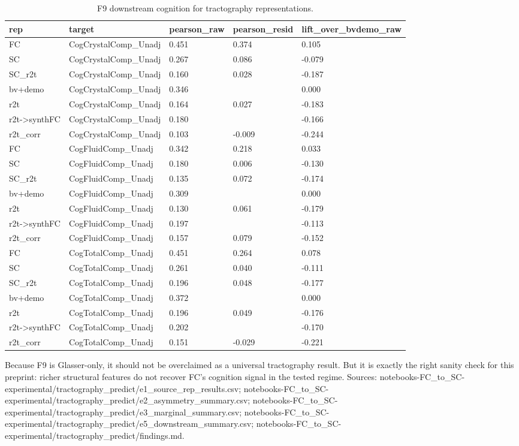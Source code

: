 \documentclass{article}
\begin{document}
\begin{table}[H]
\centering
\scriptsize
\caption{F9 downstream cognition for tractography representations.}
\label{tab:f9e5}
\begin{tabular}{lllll}
\toprule
rep & target & pearson\_raw & pearson\_resid & lift\_over\_bvdemo\_raw \\
\midrule
FC & CogCrystalComp\_Unadj & 0.451 & 0.374 & 0.105 \\
SC & CogCrystalComp\_Unadj & 0.267 & 0.086 & -0.079 \\
SC\_r2t & CogCrystalComp\_Unadj & 0.160 & 0.028 & -0.187 \\
bv+demo & CogCrystalComp\_Unadj & 0.346 &  & 0.000 \\
r2t & CogCrystalComp\_Unadj & 0.164 & 0.027 & -0.183 \\
r2t->synthFC & CogCrystalComp\_Unadj & 0.180 &  & -0.166 \\
r2t\_corr & CogCrystalComp\_Unadj & 0.103 & -0.009 & -0.244 \\
FC & CogFluidComp\_Unadj & 0.342 & 0.218 & 0.033 \\
SC & CogFluidComp\_Unadj & 0.180 & 0.006 & -0.130 \\
SC\_r2t & CogFluidComp\_Unadj & 0.135 & 0.072 & -0.174 \\
bv+demo & CogFluidComp\_Unadj & 0.309 &  & 0.000 \\
r2t & CogFluidComp\_Unadj & 0.130 & 0.061 & -0.179 \\
r2t->synthFC & CogFluidComp\_Unadj & 0.197 &  & -0.113 \\
r2t\_corr & CogFluidComp\_Unadj & 0.157 & 0.079 & -0.152 \\
FC & CogTotalComp\_Unadj & 0.451 & 0.264 & 0.078 \\
SC & CogTotalComp\_Unadj & 0.261 & 0.040 & -0.111 \\
SC\_r2t & CogTotalComp\_Unadj & 0.196 & 0.048 & -0.177 \\
bv+demo & CogTotalComp\_Unadj & 0.372 &  & 0.000 \\
r2t & CogTotalComp\_Unadj & 0.196 & 0.049 & -0.176 \\
r2t->synthFC & CogTotalComp\_Unadj & 0.202 &  & -0.170 \\
r2t\_corr & CogTotalComp\_Unadj & 0.151 & -0.029 & -0.221 \\
\bottomrule
\end{tabular}
\end{table}

Because F9 is Glasser-only, it should not be overclaimed as a universal tractography
result. But it is exactly the right sanity check for this preprint: richer structural
features do not recover FC's cognition signal in the tested regime.  Sources: notebooks-FC\_to\_SC-experimental/tractography\_predict/e1\_source\_rep\_results.csv; notebooks-FC\_to\_SC-experimental/tractography\_predict/e2\_asymmetry\_summary.csv; notebooks-FC\_to\_SC-experimental/tractography\_predict/e3\_marginal\_summary.csv; notebooks-FC\_to\_SC-experimental/tractography\_predict/e5\_downstream\_summary.csv; notebooks-FC\_to\_SC-experimental/tractography\_predict/findings.md.
\end{document}
